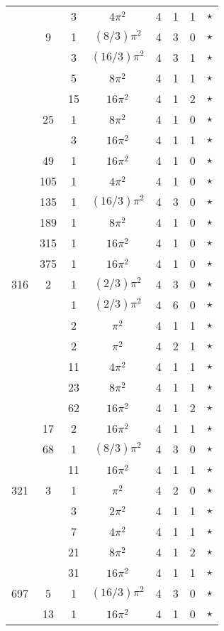 \begin{tabular}{ccc|ccccc}
 &  & 3 & $4\pi^2$ & 4 & 1 & 1 & $\star$ \\
 & 9 & 1 & $(8/3)\pi^2$ & 4 & 3 & 0 & $\star$ \\
 &  & 3 & $(16/3)\pi^2$ & 4 & 3 & 1 & $\star$ \\
 &  & 5 & $8\pi^2$ & 4 & 1 & 1 & $\star$ \\
 &  & 15 & $16\pi^2$ & 4 & 1 & 2 & $\star$ \\
 & 25 & 1 & $8\pi^2$ & 4 & 1 & 0 & $\star$ \\
 &  & 3 & $16\pi^2$ & 4 & 1 & 1 & $\star$ \\
 & 49 & 1 & $16\pi^2$ & 4 & 1 & 0 & $\star$ \\
 & 105 & 1 & $4\pi^2$ & 4 & 1 & 0 & $\star$ \\
 & 135 & 1 & $(16/3)\pi^2$ & 4 & 3 & 0 & $\star$ \\
 & 189 & 1 & $8\pi^2$ & 4 & 1 & 0 & $\star$ \\
 & 315 & 1 & $16\pi^2$ & 4 & 1 & 0 & $\star$ \\
 & 375 & 1 & $16\pi^2$ & 4 & 1 & 0 & $\star$ \\
316 & 2 & 1 & $(2/3)\pi^2$ & 4 & 3 & 0 & $\star$ \\
 &  & 1 & $(2/3)\pi^2$ & 4 & 6 & 0 & $\star$ \\
 &  & 2 & $\pi^2$ & 4 & 1 & 1 & $\star$ \\
 &  & 2 & $\pi^2$ & 4 & 2 & 1 & $\star$ \\
 &  & 11 & $4\pi^2$ & 4 & 1 & 1 & $\star$ \\
 &  & 23 & $8\pi^2$ & 4 & 1 & 1 & $\star$ \\
 &  & 62 & $16\pi^2$ & 4 & 1 & 2 & $\star$ \\
 & 17 & 2 & $16\pi^2$ & 4 & 1 & 1 & $\star$ \\
 & 68 & 1 & $(8/3)\pi^2$ & 4 & 3 & 0 & $\star$ \\
 &  & 11 & $16\pi^2$ & 4 & 1 & 1 & $\star$ \\
321 & 3 & 1 & $\pi^2$ & 4 & 2 & 0 & $\star$ \\
 &  & 3 & $2\pi^2$ & 4 & 1 & 1 & $\star$ \\
 &  & 7 & $4\pi^2$ & 4 & 1 & 1 & $\star$ \\
 &  & 21 & $8\pi^2$ & 4 & 1 & 2 & $\star$ \\
 &  & 31 & $16\pi^2$ & 4 & 1 & 1 & $\star$ \\
697 & 5 & 1 & $(16/3)\pi^2$ & 4 & 3 & 0 & $\star$ \\
 & 13 & 1 & $16\pi^2$ & 4 & 1 & 0 & $\star$ \\

\end{tabular}

